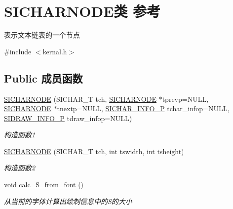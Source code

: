 \hypertarget{class_s_i_c_h_a_r_n_o_d_e}{}\section{S\+I\+C\+H\+A\+R\+N\+O\+D\+E类 参考}
\label{class_s_i_c_h_a_r_n_o_d_e}


表示文本链表的一个节点~\newline
 




{\ttfamily \#include $<$kernal.\+h$>$}

\subsection*{Public 成员函数}
\begin{DoxyCompactItemize}
\item 
\mbox{\label{class_s_i_c_h_a_r_n_o_d_e_a69da1200fe43cf1aab75e44650cdd21b}} 
\hyperlink{class_s_i_c_h_a_r_n_o_d_e_a69da1200fe43cf1aab75e44650cdd21b}{S\+I\+C\+H\+A\+R\+N\+O\+DE} (S\+I\+C\+H\+A\+R\+\_\+T tch, \hyperlink{class_s_i_c_h_a_r_n_o_d_e}{S\+I\+C\+H\+A\+R\+N\+O\+DE} $\ast$tprevp=N\+U\+LL, \hyperlink{class_s_i_c_h_a_r_n_o_d_e}{S\+I\+C\+H\+A\+R\+N\+O\+DE} $\ast$tnextp=N\+U\+LL, \hyperlink{class_s_i_c_h_a_r___i_n_f_o}{S\+I\+C\+H\+A\+R\+\_\+\+I\+N\+F\+O\+\_\+P} tchar\+\_\+infop=N\+U\+LL, \hyperlink{class_s_i_d_r_a_w___i_n_f_o}{S\+I\+D\+R\+A\+W\+\_\+\+I\+N\+F\+O\+\_\+P} tdraw\+\_\+infop=N\+U\+LL)
\begin{DoxyCompactList}\small\item\em 构造函数1 \end{DoxyCompactList}\item 
\mbox{\label{class_s_i_c_h_a_r_n_o_d_e_aa06366dc16bf0aab9d16aaf43be0f8a3}} 
\hyperlink{class_s_i_c_h_a_r_n_o_d_e_aa06366dc16bf0aab9d16aaf43be0f8a3}{S\+I\+C\+H\+A\+R\+N\+O\+DE} (S\+I\+C\+H\+A\+R\+\_\+T tch, int tswidth, int tsheight)
\begin{DoxyCompactList}\small\item\em 构造函数2 \end{DoxyCompactList}\item 
void \hyperlink{class_s_i_c_h_a_r_n_o_d_e_ab0d781b8bb3d87470d1826cea65b61aa}{calc\+\_\+\+S\+\_\+from\+\_\+font} ()
\begin{DoxyCompactList}\small\item\em 从当前的字体计算出绘制信息中的\+S的大小 \end{DoxyCompactList}\item 

\end{DoxyCompactItemize}
